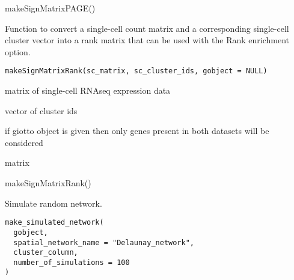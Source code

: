 \documentclass[a4paper]{book}
\begin{document}
%
\begin{Examples}
\begin{ExampleCode}
    makeSignMatrixPAGE()
\end{ExampleCode}
\end{Examples}
%
\begin{Description}\relax
Function to convert a single-cell count matrix
and a corresponding single-cell cluster vector into
a rank matrix that can be used with the Rank enrichment option.
\end{Description}
%
\begin{Usage}
\begin{verbatim}
makeSignMatrixRank(sc_matrix, sc_cluster_ids, gobject = NULL)
\end{verbatim}
\end{Usage}
%
\begin{Arguments}
\begin{ldescription}
\item[\code{sc\_matrix}] matrix of single-cell RNAseq expression data

\item[\code{sc\_cluster\_ids}] vector of cluster ids

\item[\code{gobject}] if giotto object is given then only genes present in both datasets will be considered
\end{ldescription}
\end{Arguments}
%
\begin{Value}
matrix
\end{Value}
%
\begin{SeeAlso}\relax
{}
\end{SeeAlso}
%
\begin{Examples}
\begin{ExampleCode}
    makeSignMatrixRank()
\end{ExampleCode}
\end{Examples}
%
\begin{Description}\relax
Simulate random network.
\end{Description}
%
\begin{Usage}
\begin{verbatim}
make_simulated_network(
  gobject,
  spatial_network_name = "Delaunay_network",
  cluster_column,
  number_of_simulations = 100
)
\end{verbatim}
\end{Usage}
\end{document}
